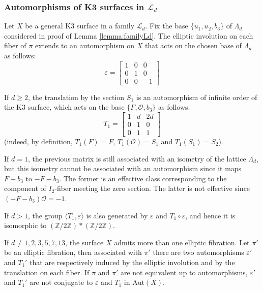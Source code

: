\documentclass{amsart}
\theoremstyle{definition}
\numberwithin{equation}{section}
\begin{document}
\subsubsection{Automorphisms of K3 surfaces in $\mathcal{L}_d$}	

Let $X$ be a general K3 surface in a family $\mathcal{L}_d$. Fix the base $\{u_1,u_2,b_3\}$ of $\Lambda_{d}$ considered in proof of Lemma \ref{lemma:familyLd}.
The elliptic involution on each fiber of $\pi$ extends to an automorphism on $X$ that acts on the chosen base of $\Lambda_d$ as follows:
$$\varepsilon=\left[\begin{array}{rrr}1&0&0\\
0&1&0\\
0&0&-1\end{array}\right]$$

If $d\geq 2$, the translation by the section $S_1$ is an automorphism of infinite order of the K3 surface, which acts on the base $\{F,\mathcal{O},b_3\}$ as follows:
$$T_1=\left[\begin{array}{rrr}1&d&2d\\
0&1&0\\
0&1&1
\end{array}\right]$$
(indeed, by definition, $T_1(F)=F$, $T_1(\mathcal{O})=S_1$ and $T_1(S_1)=S_2$).
	
If $d=1$, the previous matrix is still associated with an isometry of the lattice $\Lambda_{d}$, but this isometry cannot be associated with an automorphism since it maps $F-b_3$ to $-F-b_3$. The former is an effective class corresponding to the component of  $I_2$-fiber meeting the zero section. The latter is not effective since $(-F-b_3)\mathcal{O}=-1$.

If $d>1$, the group $\langle T_1, \varepsilon\rangle$ is also generated by $\varepsilon$ and $ T_1\circ\varepsilon$, and hence it is isomorphic to $\left(\mathbb{Z}/2\mathbb{Z}\right)*\left( \mathbb{Z}/2\mathbb{Z}\right)$.

    If $d\neq 1,2,3,5,7,13$, the surface $X$ admits more than one elliptic fibration. Let $\pi'$ be an elliptic fibration, then associated with $\pi'$ there are two automorphisms $\varepsilon'$ and $T_1'$ that are respectively induced by the elliptic involution and by the translation on each fiber. If $\pi$ and $\pi'$ are not equivalent up to automorphisms, $\varepsilon'$ and $T_1'$ are not conjugate to $\varepsilon$ and $T_1$ in $\mathrm{Aut}(X)$.
\end{document}
